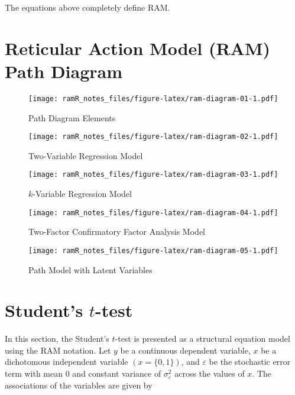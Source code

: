 \documentclass[
]{book}
\theoremstyle{definition}
\theoremstyle{definition}
\theoremstyle{definition}
\theoremstyle{remark}
\begin{document}
The equations above completely define RAM.

\hypertarget{ram-diagram}{%
\chapter{Reticular Action Model (RAM) Path Diagram}\label{ram-diagram}}

\begin{figure}
\centering
\texttt{[image: ramR\_notes\_files/figure-latex/ram-diagram-01-1.pdf]}
\caption{\label{fig:ram-diagram-01}Path Diagram Elements}
\end{figure}

\begin{figure}
\centering
\texttt{[image: ramR\_notes\_files/figure-latex/ram-diagram-02-1.pdf]}
\caption{\label{fig:ram-diagram-02}Two-Variable Regression Model}
\end{figure}

\begin{figure}
\centering
\texttt{[image: ramR\_notes\_files/figure-latex/ram-diagram-03-1.pdf]}
\caption{\label{fig:ram-diagram-03}\(k\)-Variable Regression Model}
\end{figure}

\begin{figure}
\centering
\texttt{[image: ramR\_notes\_files/figure-latex/ram-diagram-04-1.pdf]}
\caption{\label{fig:ram-diagram-04}Two-Factor Confirmatory Factor Analysis Model}
\end{figure}

\begin{figure}
\centering
\texttt{[image: ramR\_notes\_files/figure-latex/ram-diagram-05-1.pdf]}
\caption{\label{fig:ram-diagram-05}Path Model with Latent Variables}
\end{figure}

\hypertarget{ram-t}{%
\chapter{\texorpdfstring{Student's \(t\)-test}{Student's t-test}}\label{ram-t}}

In this section,
the Student's \(t\)-test is presented as a structural equation model
using the RAM notation.
Let \(y\) be a continuous dependent variable,
\(x\) be a dichotomous independent variable
\(\left( x = \{0, 1\} \right)\),
and \(\varepsilon\) be the stochastic error term
with mean 0 and constant variance of \(\sigma_{\varepsilon}^{2}\)
across the values of \(x\).
The associations of the variables are given by
\end{document}
